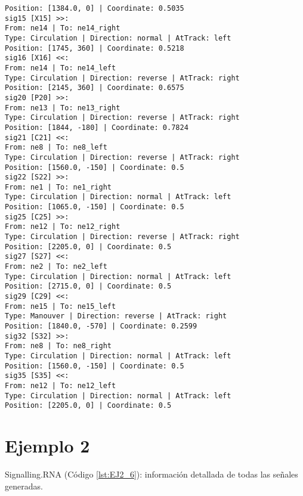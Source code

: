 \begin{lstlisting}[language = {}, caption = Signalling.RNA, label = {lst:EJ1_6}]
Position: [1384.0, 0] | Coordinate: 0.5035
sig15 [X15] >>:
From: ne14 | To: ne14_right
Type: Circulation | Direction: normal | AtTrack: left 
Position: [1745, 360] | Coordinate: 0.5218
sig16 [X16] <<:
From: ne14 | To: ne14_left
Type: Circulation | Direction: reverse | AtTrack: right 
Position: [2145, 360] | Coordinate: 0.6575
sig20 [P20] >>:
From: ne13 | To: ne13_right
Type: Circulation | Direction: reverse | AtTrack: right 
Position: [1844, -180] | Coordinate: 0.7824
sig21 [C21] <<:
From: ne8 | To: ne8_left
Type: Circulation | Direction: reverse | AtTrack: right 
Position: [1560.0, -150] | Coordinate: 0.5
sig22 [S22] >>:
From: ne1 | To: ne1_right
Type: Circulation | Direction: normal | AtTrack: left 
Position: [1065.0, -150] | Coordinate: 0.5
sig25 [C25] >>:
From: ne12 | To: ne12_right
Type: Circulation | Direction: reverse | AtTrack: right 
Position: [2205.0, 0] | Coordinate: 0.5
sig27 [S27] <<:
From: ne2 | To: ne2_left
Type: Circulation | Direction: normal | AtTrack: left 
Position: [2715.0, 0] | Coordinate: 0.5
sig29 [C29] <<:
From: ne15 | To: ne15_left
Type: Manouver | Direction: reverse | AtTrack: right 
Position: [1840.0, -570] | Coordinate: 0.2599
sig32 [S32] >>:
From: ne8 | To: ne8_right
Type: Circulation | Direction: normal | AtTrack: left 
Position: [1560.0, -150] | Coordinate: 0.5
sig35 [S35] <<:
From: ne12 | To: ne12_left
Type: Circulation | Direction: normal | AtTrack: left 
Position: [2205.0, 0] | Coordinate: 0.5
		\end{lstlisting}	
	\section{Ejemplo 2}
	Signalling.RNA (Código \ref{lst:EJ2_6}): información detallada de todas las señales generadas.
	

